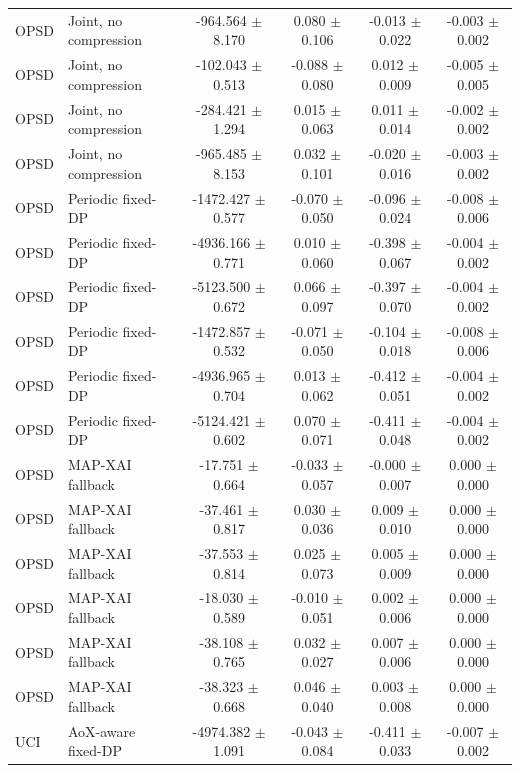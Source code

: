 \begin{table}[t]
\begin{tabular}{llcccc}
OPSD & Joint, no compression & -964.564 $\pm$ 8.170 & 0.080 $\pm$ 0.106 & -0.013 $\pm$ 0.022 & -0.003 $\pm$ 0.002 \\
OPSD & Joint, no compression & -102.043 $\pm$ 0.513 & -0.088 $\pm$ 0.080 & 0.012 $\pm$ 0.009 & -0.005 $\pm$ 0.005 \\
OPSD & Joint, no compression & -284.421 $\pm$ 1.294 & 0.015 $\pm$ 0.063 & 0.011 $\pm$ 0.014 & -0.002 $\pm$ 0.002 \\
OPSD & Joint, no compression & -965.485 $\pm$ 8.153 & 0.032 $\pm$ 0.101 & -0.020 $\pm$ 0.016 & -0.003 $\pm$ 0.002 \\
OPSD & Periodic fixed-DP & -1472.427 $\pm$ 0.577 & -0.070 $\pm$ 0.050 & -0.096 $\pm$ 0.024 & -0.008 $\pm$ 0.006 \\
OPSD & Periodic fixed-DP & -4936.166 $\pm$ 0.771 & 0.010 $\pm$ 0.060 & -0.398 $\pm$ 0.067 & -0.004 $\pm$ 0.002 \\
OPSD & Periodic fixed-DP & -5123.500 $\pm$ 0.672 & 0.066 $\pm$ 0.097 & -0.397 $\pm$ 0.070 & -0.004 $\pm$ 0.002 \\
OPSD & Periodic fixed-DP & -1472.857 $\pm$ 0.532 & -0.071 $\pm$ 0.050 & -0.104 $\pm$ 0.018 & -0.008 $\pm$ 0.006 \\
OPSD & Periodic fixed-DP & -4936.965 $\pm$ 0.704 & 0.013 $\pm$ 0.062 & -0.412 $\pm$ 0.051 & -0.004 $\pm$ 0.002 \\
OPSD & Periodic fixed-DP & -5124.421 $\pm$ 0.602 & 0.070 $\pm$ 0.071 & -0.411 $\pm$ 0.048 & -0.004 $\pm$ 0.002 \\
OPSD & MAP-XAI fallback & -17.751 $\pm$ 0.664 & -0.033 $\pm$ 0.057 & -0.000 $\pm$ 0.007 & 0.000 $\pm$ 0.000 \\
OPSD & MAP-XAI fallback & -37.461 $\pm$ 0.817 & 0.030 $\pm$ 0.036 & 0.009 $\pm$ 0.010 & 0.000 $\pm$ 0.000 \\
OPSD & MAP-XAI fallback & -37.553 $\pm$ 0.814 & 0.025 $\pm$ 0.073 & 0.005 $\pm$ 0.009 & 0.000 $\pm$ 0.000 \\
OPSD & MAP-XAI fallback & -18.030 $\pm$ 0.589 & -0.010 $\pm$ 0.051 & 0.002 $\pm$ 0.006 & 0.000 $\pm$ 0.000 \\
OPSD & MAP-XAI fallback & -38.108 $\pm$ 0.765 & 0.032 $\pm$ 0.027 & 0.007 $\pm$ 0.006 & 0.000 $\pm$ 0.000 \\
OPSD & MAP-XAI fallback & -38.323 $\pm$ 0.668 & 0.046 $\pm$ 0.040 & 0.003 $\pm$ 0.008 & 0.000 $\pm$ 0.000 \\
UCI & AoX-aware fixed-DP & -4974.382 $\pm$ 1.091 & -0.043 $\pm$ 0.084 & -0.411 $\pm$ 0.033 & -0.007 $\pm$ 0.002 \\

\end{tabular}
\end{table}
